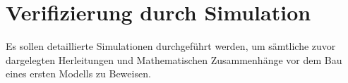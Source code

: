 \section{Verifizierung durch Simulation}
	Es sollen detaillierte Simulationen durchgeführt werden, um sämtliche zuvor dargelegten Herleitungen und Mathematischen Zusammenhänge vor dem Bau eines ersten Modells zu Beweisen.